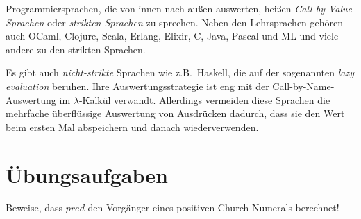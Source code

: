 Programmiersprachen, die von innen nach außen auswerten, heißen
\textit{Call-by-Value-Sprachen} oder
\textit{strikten Sprachen} zu sprechen.  Neben
den Lehrsprachen gehören auch OCaml, Clojure, Scala, Erlang, Elixir,
C, Java, Pascal und ML und viele andere zu den strikten Sprachen.

Es gibt auch \textit{nicht-strikte}
Sprachen wie z.B.\ Haskell,
die auf der sogenannten \textit{lazy evaluation} beruhen.  Ihre
Auswertungsstrategie ist eng mit der Call-by-Name-Auswertung im
$\lambda$-Kalkül verwandt.  Allerdings vermeiden diese Sprachen die
mehrfache überflüssige Auswertung von Ausdrücken dadurch, dass sie den
Wert beim ersten Mal abspeichern und danach wiederverwenden.

\section*{Übungsaufgaben}



\begin{aufgabe}\label{ex:pred}
  Beweise, dass $\mathit{pred}$ den Vorgänger eines
  positiven Church-Numerals berechnet!
\end{aufgabe}

